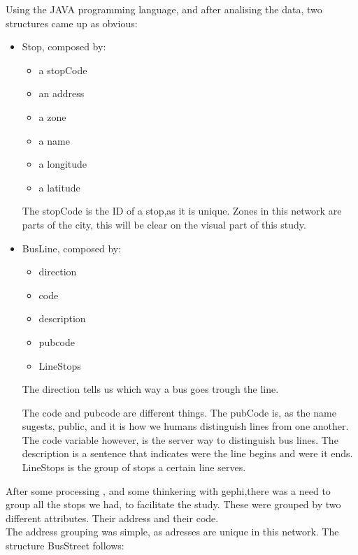 \documentclass[12pt]{article}
\begin{document}
Using the JAVA programming language, and after analising the data, two structures came up as obvious:
\begin{itemize}
\item Stop, composed by:
	\begin{itemize}
	\item a stopCode
	\item an address
	\item a zone
	\item a name
	\item a longitude
	\item a latitude
	\end{itemize}
	The stopCode is the ID of a stop,as it is unique.
	Zones in this network are parts of the city, this will be clear on the visual part 		of this study.
	
\item BusLine, composed by:
	\begin{itemize}
	\item direction
	\item code
	\item description
	\item pubcode
	\item LineStops
	\end{itemize}
	

	The direction tells us which way a bus goes trough the line.

	The code and pubcode are different things. The pubCode is, as the name sugests, 			public, and it is how we humans distinguish lines from one another. 
	The code variable however, is the server way to distinguish bus lines.
	The description is a sentence that indicates were the line begins and were it ends.
	LineStops is the group of stops a certain line serves.
	
\end{itemize}
	After some processing , and some thinkering with gephi,there was a need to group all the stops we had, to facilitate the study. These were grouped by two different attributes. Their address and their code. \\
	
The address grouping was simple, as adresses are unique in this network. The structure BusStreet follows:	
	
\end{document}
